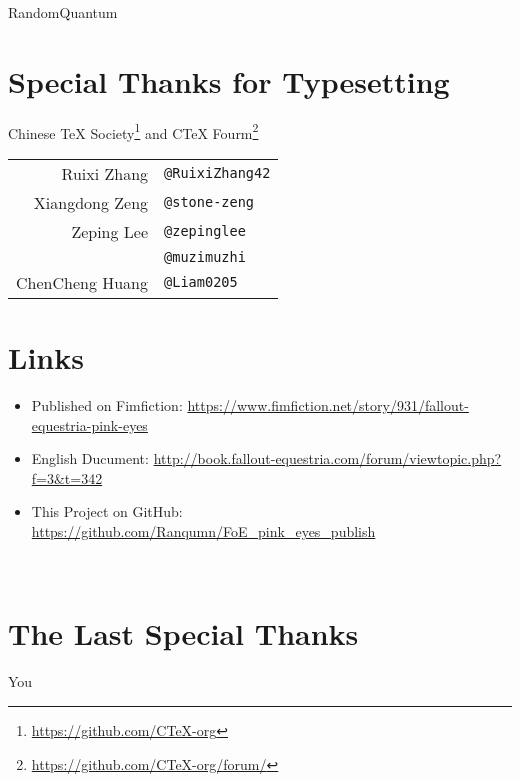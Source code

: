 \begin{center}
    RandomQuantum
\end{center}

\section*{Special Thanks for Typesetting}

\begin{table}[H]
    \centering
    
    \begin{center}
    Chinese \TeX{} Society\footnote{\url{https://github.com/CTeX-org}} and C\TeX{} Fourm\footnote{\url{https://github.com/CTeX-org/forum/}}
    \end{center}
  
    \begin{tabular}{rl}
        Ruixi Zhang & \texttt{@RuixiZhang42} \\
        Xiangdong Zeng & \texttt{@stone-zeng} \\
        Zeping Lee & \texttt{@zepinglee} \\
        & \texttt{@muzimuzhi} \\
        ChenCheng Huang & \texttt{@Liam0205} \\
    \end{tabular}
\end{table}


\section*{Links}

\begin{itemize}
    \item Published on Fimfiction: \url{https://www.fimfiction.net/story/931/fallout-equestria-pink-eyes}
    \item English Ducument: \url{http://book.fallout-equestria.com/forum/viewtopic.php?f=3\&t=342}
    \item This Project on GitHub: \url{https://github.com/Ranqumn/FoE_pink_eyes_publish}
\end{itemize}


\clearpage


~\vfill

\section*{The Last Special Thanks}

\begin{center}

    \Large You

\end{center}

